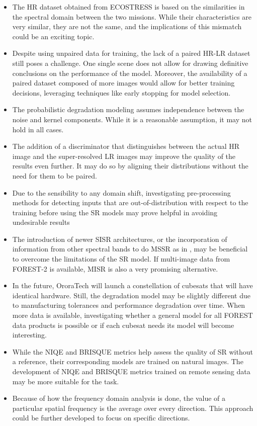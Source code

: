 \begin{itemize}

    \item The HR dataset obtained from ECOSTRESS is based on the similarities in the spectral domain between the two missions. While their characteristics are very similar, they are not the same, and the implications of this mismatch could be an exciting topic.
    
    \item Despite using unpaired data for training, the lack of a paired HR-LR dataset still poses a challenge. One single scene does not allow for drawing definitive conclusions on the performance of the model. Moreover, the availability of a paired dataset composed of more images would allow for better training decisions, leveraging techniques like early stopping for model selection. 
    
    \item The probabilistic degradation modeling assumes independence between the noise and kernel components. While it is a reasonable assumption, it may not hold in all cases.
    
    \item The addition of a discriminator that distinguishes between the actual HR image and the super-resolved LR images may improve the quality of the results even further. It may do so by aligning their distributions without the need for them to be paired.
    
    \item Due to the sensibility to any domain shift, investigating pre-processing methods for detecting inputs that are out-of-distribution with respect to the training before using the SR models may prove helpful in avoiding undesirable results
    
    \item The introduction of newer SISR architectures, or the incorporation of information from other spectral bands to do MSSR as in \cite{myself2023}, may be beneficial to overcome the limitations of the SR model. If multi-image data from FOREST-2 is available, MISR is also a very promising alternative.
    
    \item In the future, OroraTech will launch a constellation of cubesats that will have identical hardware. Still, the degradation model may be slightly different due to manufacturing tolerances and performance degradation over time. When more data is available, investigating whether a general model for all FOREST data products is possible or if each cubesat needs its model will become interesting.
    \item While the NIQE and BRISQUE metrics help assess the quality of SR without a reference, their corresponding models are trained on natural images. The development of NIQE and BRISQUE metrics trained on remote sensing data may be more suitable for the task.
    \item Because of how the frequency domain analysis is done, the value of a particular spatial frequency is the average over every direction. This approach could be further developed to focus on specific directions.
    
    
\end{itemize}